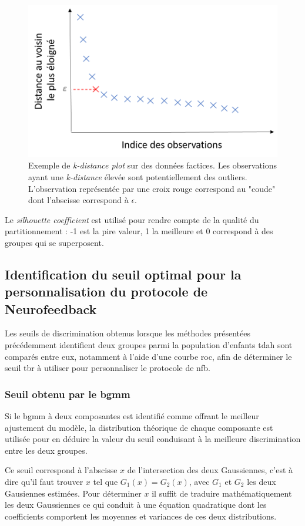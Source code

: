 \begin{figure}[h!]
  \centering
	\includegraphics[width=0.7\linewidth]{figures/chapter-4/tbr-k-distance-plot-example} 
  \caption{Exemple de \textit{k-distance plot} sur des données factices. Les observations ayant une \textit{k-distance} élevée sont potentiellement
	des outliers. L'observation représentée par une croix rouge correspond au "coude" dont l'abscisse correspond à $\epsilon$.} 
	\label{Figure:tbr_k_distance_plot_example} 
\end{figure}

Le \textit{silhouette coefficient} est utilisé pour rendre compte de la qualité du partitionnement : -1 est la pire valeur, 1 la meilleure et 0
correspond à des groupes qui se superposent.

\subsection{Identification du seuil optimal pour la personnalisation du protocole de Neurofeedback}

Les seuils de discrimination obtenus lorsque les méthodes présentées précédemment identifient deux groupes parmi la population d'enfants \gls{tdah} 
sont comparés entre eux, notamment à l'aide d'une courbe \gls{roc}, afin de déterminer le seuil \gls{tbr} à utiliser pour personnaliser le protocole de \gls{nfb}. 

\subsubsection{Seuil obtenu par le \gls{bgmm}}
Si le \gls{bgmm} à deux composantes est identifié comme offrant le meilleur ajustement du modèle, la distribution théorique de chaque composante 
est utilisée pour en déduire la valeur du seuil conduisant à la meilleure discrimination entre les deux groupes. 

Ce seuil correspond à l'abscisse $x$ de l'intersection des deux Gaussiennes, c'est à dire qu'il faut trouver $x$ tel que $G_1(x) = G_2(x)$, avec $G_1$ et $G_2$ les deux Gausiennes estimées. 
Pour déterminer $x$ il suffit de traduire mathématiquement les deux Gaussiennes ce qui
conduit à une équation quadratique dont les coefficients comportent les moyennes et variances de ces deux distributions.

